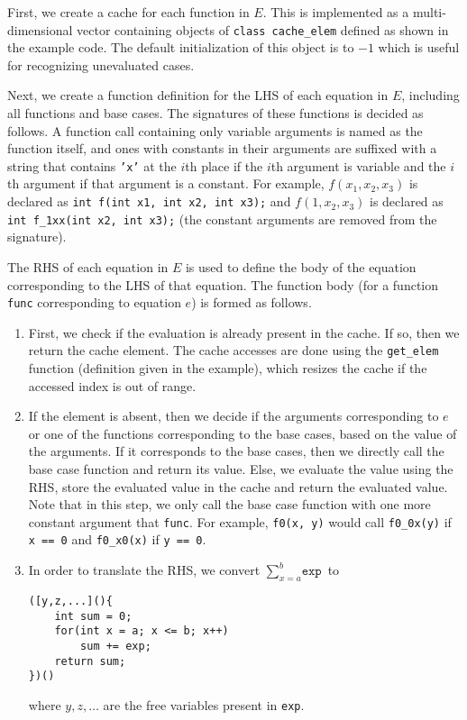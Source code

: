 \documentclass{article}
\begin{document}
First, we create a cache for each function in $E$. This is implemented as a
multi-dimensional vector containing objects of \texttt{class cache\_elem}
defined as shown in the example code. The default initialization of this object
is to $-1$ which is useful for recognizing unevaluated cases.

Next, we create a function definition for the LHS of each equation in $E$,
including all functions and base cases. The signatures of these functions is
decided as follows. A function call containing only variable arguments is named
as the function itself, and ones with constants in their arguments are suffixed
with a string that contains \texttt{'x'} at the $i$th place if the $i$th
argument is variable and the $i$th argument if that argument is a constant. For
example, $f(x_{1}, x_{2}, x_{3})$ is declared as \texttt{int f(int x1, int x2,
  int x3);} and $f(1, x_{2}, x_{3})$ is declared as \texttt{int f\_1xx(int x2,
  int x3);} (the constant arguments are removed from the signature).

The RHS of each equation in $E$ is used to define the body of the equation
corresponding to the LHS of that equation. The function body (for a function
\texttt{func} corresponding to equation $e$) is formed as follows.
\begin{enumerate}
  \item First, we check if the evaluation is already present in the cache. If
        so, then we return the cache element. The cache accesses are done using
        the \texttt{get\_elem} function (definition given in the example), which
        resizes the cache if the accessed index is out of range.
  \item If the element is absent, then we decide if the arguments corresponding
        to $e$ or one of the functions corresponding to the base cases, based on
        the value of the arguments. If it corresponds to the base cases, then we
        directly call the base case function and return its value. Else, we
        evaluate the value using the RHS, store the evaluated value in the cache
        and return the evaluated value. Note that in this step, we only call the
        base case function with one more constant argument that \texttt{func}.
        For example, \texttt{f0(x, y)} would call \texttt{f0\_0x(y)} if
        \texttt{x == 0} and \texttt{f0\_x0(x)} if \texttt{y == 0}.
  \item In order to translate the RHS, we convert $\sum_{x=a}^{b} \texttt{exp}$
        to
\begin{lstlisting}
([y,z,...](){
    int sum = 0;
    for(int x = a; x <= b; x++)
        sum += exp;
    return sum;
})()
\end{lstlisting}
        where $y, z, \dots$ are the free variables present in \texttt{exp}.
\end{enumerate}



\end{document}
